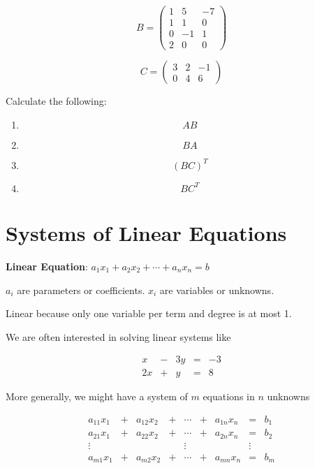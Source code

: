 \documentclass[]{book}
\providecommand{\tightlist}{%
  \setlength{\itemsep}{0pt}\setlength{\parskip}{0pt}}
\theoremstyle{definition}
\theoremstyle{definition}
\theoremstyle{definition}
\theoremstyle{remark}
\begin{document}
\[B = \begin{pmatrix} 1&5&-7\\1&1&0\\0&-1&1\\2&0&0\end{pmatrix} \]

\[C =  \begin{pmatrix} 3&2&-1\\0&4&6 \end{pmatrix}\]

Calculate the following:

\begin{enumerate}
\def\labelenumi{\arabic{enumi}.}
\tightlist
\item
  \[AB\]
\item
  \[BA\]
\item
  \[(BC)^T\]
\item
  \[BC^T\]
\end{enumerate}

\section{Systems of Linear Equations}\label{systems-of-linear-equations}

\textbf{Linear Equation}: \(a_1 x_1 + a_2 x_2 + \cdots + a_n x_n = b\)

\(a_i\) are parameters or coefficients. \(x_i\) are variables or
unknowns.

Linear because only one variable per term and degree is at most 1.

We are often interested in solving linear systems like

\[\begin{matrix}
            x  & - & 3y & = & -3\\
            2x & + &  y & = &  8
            \end{matrix}\]

More generally, we might have a system of \(m\) equations in \(n\)
unknowns

\[\begin{matrix}
            a_{11}x_1  & + & a_{12}x_2 & + & \cdots & + & a_{1n}x_n & = & b_1\\
            a_{21}x_1  & + & a_{22}x_2 & + & \cdots & + & a_{2n}x_n & = & b_2\\
            \vdots     &   &     &   & \vdots &   &     & \vdots & \\
            a_{m1}x_1  & + & a_{m2}x_2 & + & \cdots & + & a_{mn}x_n & = & b_m
            \end{matrix}\]
\end{document}
